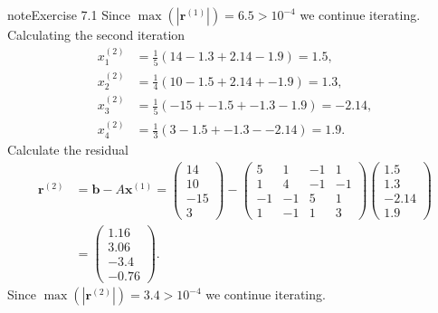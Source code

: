 \documentclass[letterpaper,10pt,english]{jupyterBook}
\begin{document}
\begin{sphinxadmonition}{note}{Exercise 7.1}
\sphinxAtStartPar
Since \(\max(| \mathbf{r}^{(1)} |) = 6.5 > 10^{-4}\) we continue iterating. Calculating the second iteration
\begin{align*}
    x_{1}^{(2)} &= \frac{1}{5} \left( 14 - 1.3 + 2.14 - 1.9 \right) = 1.5, \\
    x_{2}^{(2)} &= \frac{1}{4} \left( 10 - 1.5 + 2.14 + -1.9 \right) = 1.3, \\
    x_{3}^{(2)} &= \frac{1}{5} \left( -15 + -1.5 + -1.3 - 1.9 \right) = -2.14, \\
    x_{4}^{(2)} &= \frac{1}{3} \left( 3 - 1.5 + -1.3 - -2.14 \right) = 1.9.
\end{align*}
\sphinxAtStartPar
Calculate the residual
\begin{align*}
    \mathbf{r}^{(2)} &= \mathbf{b} - A \mathbf{x}^{(1)} = 
    \begin{pmatrix} 14 \\ 10 \\ -15 \\ 3 \end{pmatrix} -
    \begin{pmatrix} 5 & 1 & -1 & 1 \\ 1 & 4 & -1 & -1 \\ -1 & -1 & 5 & 1 \\ 1 & -1 & 1 & 3 \end{pmatrix}
    \begin{pmatrix} 1.5 \\ 1.3 \\ -2.14 \\ 1.9 \end{pmatrix} \\
    &=
    \begin{pmatrix} 1.16 \\ 3.06 \\ -3.4 \\ -0.76 \end{pmatrix}.
\end{align*}
\sphinxAtStartPar
Since \(\max(| \mathbf{r}^{(2)} |) = 3.4 > 10^{-4}\) we continue iterating.
\end{sphinxadmonition}
\end{document}
